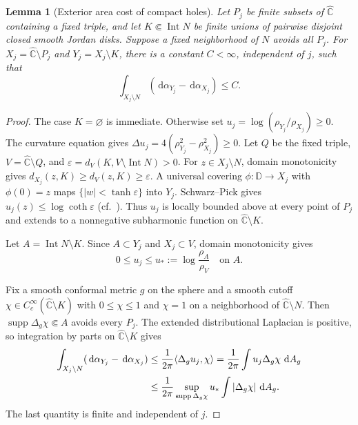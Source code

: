 \documentclass[10pt,a4paper]{amsart}
\newcommand{\D}{\mathbb D}
\newcommand{\sphere}{\widehat{\mathbb C}}
\newcommand{\dd}{\,\mathrm d}
\newtheorem{lemma}[theorem]{Lemma}
\numberwithin{equation}{section}
\begin{document}
\begin{lemma}[Exterior area cost of compact holes]\label{core:holes}
Let $P_j$ be finite subsets of $\sphere$ containing a fixed triple, and
let $K\Subset\operatorname{Int}N$ be finite unions of pairwise disjoint
closed smooth Jordan disks. Suppose a fixed neighborhood of $N$ avoids
all $P_j$. For $X_j=\sphere\setminus P_j$ and $Y_j=X_j\setminus K$,
there is a constant $C<\infty$, independent of $j$, such that
\begin{equation}\label{core:holes-bound}
 \int_{X_j\setminus N}
       (\dd\alpha_{Y_j}-\dd\alpha_{X_j})\le C.
\end{equation}
\end{lemma}
\begin{proof}
The case $K=\varnothing$ is immediate. Otherwise set
$u_j=\log(\rho_{Y_j}/\rho_{X_j})\ge0$. The curvature equation gives
$\Delta u_j=4(\rho_{Y_j}^2-\rho_{X_j}^2)\ge0$.
Let $Q$ be the fixed triple, $V=\sphere\setminus Q$, and
$\varepsilon=d_V(K,V\setminus\operatorname{Int}N)>0$.
For $z\in X_j\setminus N$, domain monotonicity gives
$d_{X_j}(z,K)\ge d_V(z,K)\ge\varepsilon$.
A universal covering $\phi:\D\to X_j$ with $\phi(0)=z$ maps
$\{|w|<\tanh\varepsilon\}$ into $Y_j$. Schwarz--Pick gives
$u_j(z)\le\log\coth\varepsilon$
(cf.\ \cite[Proposition~3.4]{MBRG}).
Thus $u_j$ is locally bounded above at every point of $P_j$ and extends
to a nonnegative subharmonic function on $\sphere\setminus K$.

Let $A=\operatorname{Int}N\setminus K$. Since $A\subset Y_j$ and
$X_j\subset V$, domain monotonicity gives
\begin{equation}\label{core:holes-comparison}
 0\le u_j\le u_*:=\log\frac{\rho_A}{\rho_V}
 \quad\text{on }A.
\end{equation}

Fix a smooth conformal metric $g$ on the sphere and a smooth cutoff
$\chi\in C_c^\infty(\sphere\setminus K)$ with $0\le\chi\le1$ and
$\chi=1$ on a neighborhood of $\sphere\setminus N$.
Then $\operatorname{supp}\Delta_g\chi\Subset A$
avoids every $P_j$. The extended distributional Laplacian is positive,
so integration by parts on $\sphere\setminus K$ gives
\begin{align}\label{core:holes-cutoff}
 \int_{X_j\setminus N}(\dd\alpha_{Y_j}-\dd\alpha_{X_j})
 &\le\frac1{2\pi}\langle\Delta_g u_j,\chi\rangle
 =\frac1{2\pi}\int u_j\Delta_g\chi\,\dd A_g\notag\\
 &\le\frac1{2\pi}
 \sup_{\operatorname{supp}\Delta_g\chi}u_*
 \int|\Delta_g\chi|\,\dd A_g.
\end{align}
The last quantity is finite and independent of $j$.
\end{proof}
\end{document}
